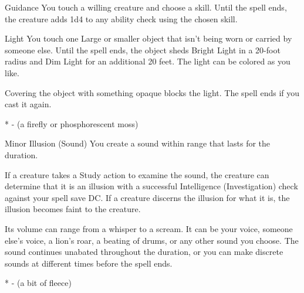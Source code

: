 


\pagestyle{empty}

\begin{Spell}[
    tags=Concentration,
    level=Cantrip,
    time=1 Action,
    range=Touch,
    components={V, S},
    duration=1 Minute,
    school=Divination,
    attack=None,
    effect=Buff
]{Guidance}
You touch a willing creature and choose a skill. Until the spell ends, the creature adds 1d4 to any ability check using the chosen skill.
\end{Spell}


\begin{Spell}[
    level=Cantrip,
    time=1 Action,
    range=Touch,
    components={V, M*},
    duration=1 Hour,
    school=Evocation,
    attack=None,
    effect=Creation
]{Light}
You touch one Large or smaller object that isn't being worn or carried by someone else. Until the spell ends, the object sheds Bright Light in a 20-foot radius and Dim Light for an additional 20 feet. The light can be colored as you like.

Covering the object with something opaque blocks the light. The spell ends if you cast it again.

* - (a firefly or phosphorescent moss)
\end{Spell}


\begin{Spell}[
    level=Cantrip,
    time=1 Action,
    range=30 ft. (5 ft. *),
    components={S, M*},
    duration=1 Minute,
    school=Illusion,
    attack=None,
    effect=Control
]{Minor Illusion (Sound)}
You create a sound within range that lasts for the duration.

If a creature takes a Study action to examine the sound, the creature can determine that it is an illusion with a successful Intelligence (Investigation) check against your spell save DC. If a creature discerns the illusion for what it is, the illusion becomes faint to the creature.

Its volume can range from a whisper to a scream. It can be your voice, someone else's voice, a lion's roar, a beating of drums, or any other sound you choose. The sound continues unabated throughout the duration, or you can make discrete sounds at different times before the spell ends.

* - (a bit of fleece)
\end{Spell}


